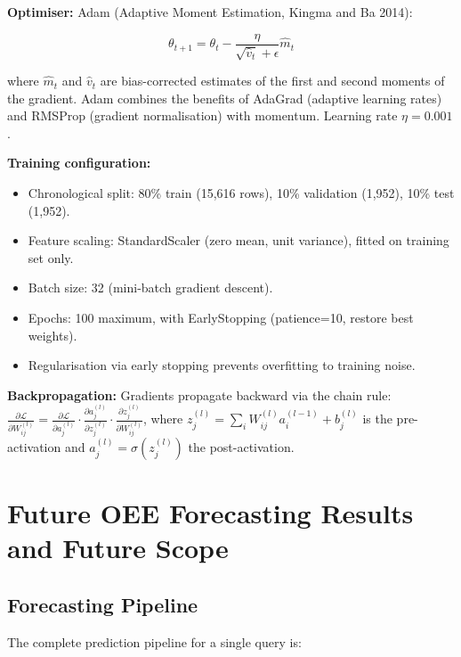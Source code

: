 \documentclass[a4paper,11pt]{article}
\begin{document}
\textbf{Optimiser:} Adam (Adaptive Moment Estimation, Kingma and Ba 2014):

\begin{equation}
\theta_{t+1} = \theta_t - \frac{\eta}{\sqrt{\hat{v}_t} + \epsilon} \hat{m}_t
\end{equation}

where $\hat{m}_t$ and $\hat{v}_t$ are bias-corrected estimates of the first and second moments of the gradient. Adam combines the benefits of AdaGrad (adaptive learning rates) and RMSProp (gradient normalisation) with momentum. Learning rate $\eta = 0.001$.

\textbf{Training configuration:}
\begin{itemize}
    \item Chronological split: 80\% train (15,616 rows), 10\% validation (1,952), 10\% test (1,952).
    \item Feature scaling: StandardScaler (zero mean, unit variance), fitted on training set only.
    \item Batch size: 32 (mini-batch gradient descent).
    \item Epochs: 100 maximum, with EarlyStopping (patience=10, restore best weights).
    \item Regularisation via early stopping prevents overfitting to training noise.
\end{itemize}

\textbf{Backpropagation:} Gradients propagate backward via the chain rule: $\frac{\partial \mathcal{L}}{\partial W_{ij}^{(l)}} = \frac{\partial \mathcal{L}}{\partial a_j^{(l)}} \cdot \frac{\partial a_j^{(l)}}{\partial z_j^{(l)}} \cdot \frac{\partial z_j^{(l)}}{\partial W_{ij}^{(l)}}$, where $z_j^{(l)} = \sum_i W_{ij}^{(l)} a_i^{(l-1)} + b_j^{(l)}$ is the pre-activation and $a_j^{(l)} = \sigma(z_j^{(l)})$ the post-activation.

\section{Future OEE Forecasting Results and Future Scope}

\subsection{Forecasting Pipeline}

The complete prediction pipeline for a single query is:
\end{document}
